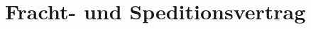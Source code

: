 \documentclass[11pt]{article}
\begin{document}
    \chapter[Fracht- und Speditionsvertrag]{Fracht- und Speditionsvertrag}

    \section[]{}
\end{document}
